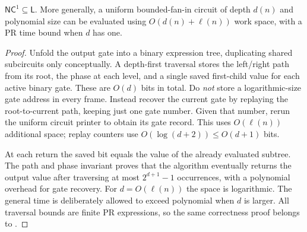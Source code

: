 \begin{theorem}\label{thm:A06}
$\mathsf{NC}^1\subseteq\mathsf L$. More generally, a uniform bounded-fan-in circuit of depth $d(n)$ and polynomial size can be evaluated using $O(d(n)+\ell(n))$ work space, with a PR time bound when $d$ has one.
\end{theorem}
\begin{proof}
Unfold the output gate into a binary expression tree, duplicating shared subcircuits only conceptually. A depth-first traversal stores the left/right path from its root, the phase at each level, and a single saved first-child value for each active binary gate. These are $O(d)$ bits in total. Do \emph{not} store a logarithmic-size gate address in every frame. Instead recover the current gate by replaying the root-to-current path, keeping just one gate number. Given that number, rerun the uniform circuit printer to obtain its gate record. This uses $O(\ell(n))$ additional space; replay counters use $O(\log(d+2))\le O(d+1)$ bits.

At each return the saved bit equals the value of the already evaluated subtree. The path and phase invariant proves that the algorithm eventually returns the output value after traversing at most $2^{d+1}-1$ occurrences, with a polynomial overhead for gate recovery. For $d=O(\ell(n))$ the space is logarithmic. The general time is deliberately allowed to exceed polynomial when $d$ is larger. All traversal bounds are finite PR expressions, so the same correctness proof belongs to \ipra.
\end{proof}

